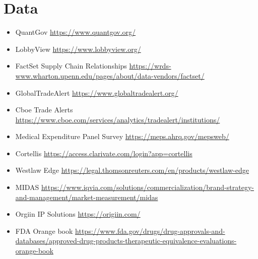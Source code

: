 \section{Data}
\begin{itemize}
    \item QuantGov \url{https://www.quantgov.org/}
    \item LobbyView \url{https://www.lobbyview.org/}
    \item FactSet Supply Chain Relationships \url{https://wrds-www.wharton.upenn.edu/pages/about/data-vendors/factset/}
    \item GlobalTradeAlert \url{https://www.globaltradealert.org/}
    \item Cboe Trade Alerts \url{https://www.cboe.com/services/analytics/tradealert/institutions/}
    \item Medical Expenditure Panel Survey \url{https://meps.ahrq.gov/mepsweb/}
    \item Cortellis \url{https://access.clarivate.com/login?app=cortellis}
    \item Westlaw Edge \url{https://legal.thomsonreuters.com/en/products/westlaw-edge}
    \item MIDAS \url{https://www.iqvia.com/solutions/commercialization/brand-strategy-and-management/market-measurement/midas}
    \item Orgiin IP Solutions \url{https://origiin.com/}
    \item FDA Orange book \url{https://www.fda.gov/drugs/drug-approvals-and-databases/approved-drug-products-therapeutic-equivalence-evaluations-orange-book}
\end{itemize}


\newpage

\footnotesize



